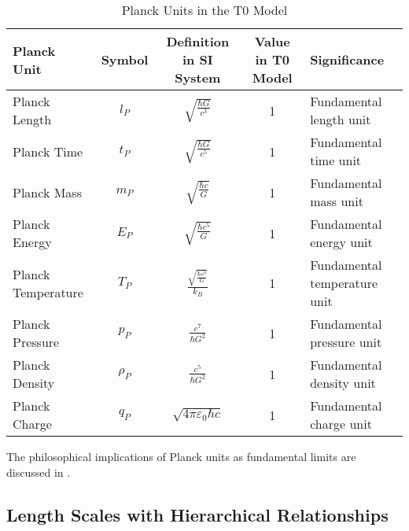 \documentclass[12pt,a4paper]{article}
\begin{document}
	\begin{table}[H]
		\centering
		\begin{adjustbox}{width=0.95\textwidth}
			\begin{tabular}{lcccl}
				\toprule
				\textbf{Planck Unit} & \textbf{Symbol} & \textbf{Definition in SI System} & \textbf{Value in T0 Model} & \textbf{Significance} \\
				\midrule
				Planck Length & \(l_P\) & \(\sqrt{\frac{\hbar G}{c^3}}\) & 1 & Fundamental length unit \\
				Planck Time & \(t_P\) & \(\sqrt{\frac{\hbar G}{c^5}}\) & 1 & Fundamental time unit \\
				Planck Mass & \(m_P\) & \(\sqrt{\frac{\hbar c}{G}}\) & 1 & Fundamental mass unit \\
				Planck Energy & \(E_P\) & \(\sqrt{\frac{\hbar c^5}{G}}\) & 1 & Fundamental energy unit \\
				Planck Temperature & \(T_P\) & \(\frac{\sqrt{\frac{\hbar c^5}{G}}}{k_B}\) & 1 & Fundamental temperature unit \\
				Planck Pressure & \(p_P\) & \(\frac{c^7}{\hbar G^2}\) & 1 & Fundamental pressure unit \\
				Planck Density & \(\rho_P\) & \(\frac{c^5}{\hbar G^2}\) & 1 & Fundamental density unit \\
				Planck Charge & \(q_P\) & \(\sqrt{4\pi \varepsilon_0 \hbar c}\) & 1 & Fundamental charge unit \\
				\bottomrule
			\end{tabular}
		\end{adjustbox}
		\caption{Planck Units in the T0 Model}
		\label{tab:planck_units}
	\end{table}
	
	The philosophical implications of Planck units as fundamental limits are discussed in \cite{pascher_planck_2025}.
	
	\subsection*{Length Scales with Hierarchical Relationships}
	
\end{document}
